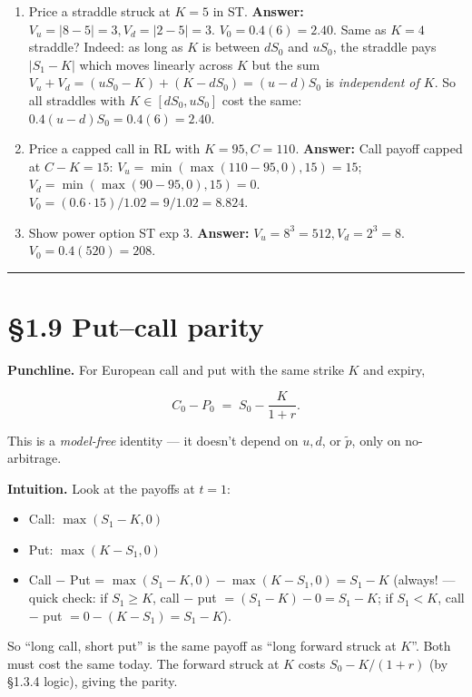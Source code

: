 \documentclass[
  10pt,
  twoside]{book}
\providecommand{\tightlist}{%
  \setlength{\itemsep}{0pt}\setlength{\parskip}{0pt}}
\begin{document}
\begin{enumerate}
\def\labelenumi{\arabic{enumi}.}
\tightlist
\item
  Price a straddle struck at \(K=5\) in ST. \textbf{Answer:}
  \(V_u=|8-5|=3, V_d=|2-5|=3\). \(V_0=0.4(6)=2.40\). Same as \(K=4\)
  straddle? Indeed: as long as \(K\) is between \(d S_0\) and \(u S_0\),
  the straddle pays \(|S_1-K|\) which moves linearly across \(K\) but
  the sum \(V_u+V_d=(uS_0-K)+(K-dS_0)=(u-d)S_0\) is \emph{independent of
  \(K\)}. So all straddles with \(K\in[dS_0,uS_0]\) cost the same:
  \(0.4(u-d)S_0=0.4(6)=2.40\).
\item
  Price a capped call in RL with \(K=95, C=110\). \textbf{Answer:} Call
  payoff capped at \(C-K=15\): \(V_u=\min(\max(110-95,0),15)=15\);
  \(V_d=\min(\max(90-95,0),15)=0\).
  \(V_0=(0.6\cdot 15)/1.02=9/1.02=8.824\).
\item
  Show power option ST exp 3. \textbf{Answer:}
  \(V_u=8^3=512, V_d=2^3=8\). \(V_0=0.4(520)=208\).
\end{enumerate}

\begin{center}\rule{0.5\linewidth}{0.5pt}\end{center}

\section{§1.9 Put--call parity}\label{putcall-parity}

\textbf{Punchline.} For European call and put with the same strike \(K\)
and expiry,

\[\boxed{C_0 - P_0 \;=\; S_0 - \dfrac{K}{1+r}.}\]

This is a \emph{model-free} identity --- it doesn't depend on \(u, d\),
or \(\tilde p\), only on no-arbitrage.

\textbf{Intuition.} Look at the payoffs at \(t=1\):

\begin{itemize}
\tightlist
\item
  Call: \(\max(S_1-K,0)\)
\item
  Put: \(\max(K-S_1,0)\)
\item
  Call − Put = \(\max(S_1-K,0)-\max(K-S_1,0) = S_1-K\) (always! ---
  quick check: if \(S_1\ge K\), call − put \(= (S_1-K)-0=S_1-K\); if
  \(S_1<K\), call − put \(= 0-(K-S_1)=S_1-K\)).
\end{itemize}

So ``long call, short put'' is the same payoff as ``long forward struck
at \(K\)''. Both must cost the same today. The forward struck at \(K\)
costs \(S_0 - K/(1+r)\) (by §1.3.4 logic), giving the parity.
\end{document}
